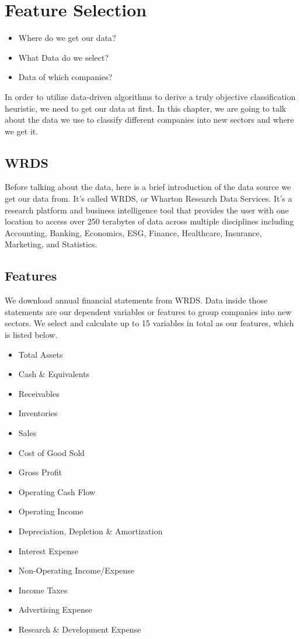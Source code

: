 \documentclass[../main.tex]{subfiles}
\begin{document}
\chapter{Feature Selection}
  
\begin{itemize}
    \item Where do we get our data?
    \item What Data do we select?
    \item Data of which companies?
\end{itemize}

In order to utilize data-driven algorithms to derive a truly objective classification heuristic, we need to get our data at first. In this chapter, we are going to talk about the data we use to classify different companies into new sectors and where we get it.

\section{WRDS}

Before talking about the data, here is a brief introduction of the data source we get our data from. It's called WRDS, or Wharton Research Data Services. It's a research platform and business intelligence tool that provides the user with one location to access over 250 terabytes of data across multiple disciplines including Accounting, Banking, Economics, ESG, Finance, Healthcare, Insurance, Marketing, and Statistics. 

\section{Features}

We download annual financial statements from WRDS. Data inside those statements are our dependent variables or features to group companies into new sectors. We select and calculate up to 15 variables in total as our features, which is listed below.

\begin{itemize}
    \item Total Assets
    \item Cash \& Equivalents
    \item Receivables
    \item Inventories
    \item Sales
    \item Cost of Good Sold
    \item Gross Profit
    \item Operating Cash Flow
    \item Operating Income
	\item Depreciation, Depletion \& Amortization
	\item Interest Expense
	\item Non-Operating Income/Expense
	\item Income Taxes
	\item Advertising Expense
	\item Research \& Development Expense
	\\~\\
\end{itemize}
\end{document}
